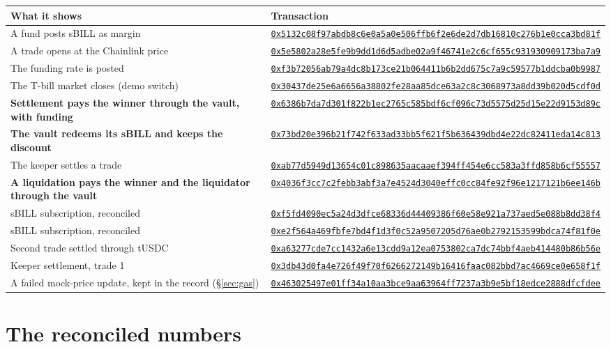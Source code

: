\documentclass[11pt,a4paper]{article}
\newcommand{\note}[1]{{\small\color{muted}#1}}
\newcommand{\etx}[1]{{\footnotesize\href{https://sepolia.etherscan.io/tx/#1}{\nolinkurl{#1}}}}
\begin{document}
\begin{center}
\footnotesize
\begin{tabular}{@{}p{5.6cm}p{9.6cm}@{}}
\toprule
\textbf{What it shows} & \textbf{Transaction} \\
\midrule
A fund posts sBILL as margin & \etx{0x5132c08f97abdb8c6e0a5a0e506ffb6f2e6de2d7db16810c276b1e0cca3bd81f} \\
A trade opens at the Chainlink price & \etx{0x5e5802a28e5fe9b9dd1d6d5adbe02a9f46741e2c6cf655c931930909173ba7a9} \\
The funding rate is posted & \etx{0xf3b72056ab79a4dc8b173ce21b064411b6b2dd675c7a9c59577b1ddcba0b9987} \\
The T-bill market closes (demo switch) & \etx{0x30437de25e6a6656a38802fe28aa85dce63a2c8c3068973a8dd39b020d5cdf0d} \\
\textbf{Settlement pays the winner through the vault, with funding} & \etx{0x6386b7da7d301f822b1ec2765c585bdf6cf096c73d5575d25d15e22d9153d89c} \\
\textbf{The vault redeems its sBILL and keeps the discount} & \etx{0x73bd20e396b21f742f633ad33bb5f621f5b636439dbd4e22dc82411eda14c813} \\
The keeper settles a trade & \etx{0xab77d5949d13654c01c898635aacaaef394ff454e6cc583a3ffd858b6cf55557} \\
\textbf{A liquidation pays the winner and the liquidator through the vault} & \etx{0x4036f3cc7c2febb3abf3a7e4524d3040effc0cc84fe92f96e1217121b6ee146b} \\
\midrule
sBILL subscription, reconciled & \etx{0xf5fd4090ec5a24d3dfce68336d44409386f60e58e921a737aed5e088b8dd38f4} \\
sBILL subscription, reconciled & \etx{0xe2f564a469fbfe7bd4f1d3f0c52a9507205d76ae0b2792153599bdca74f81f0e} \\
Second trade settled through tUSDC & \etx{0xa63277cde7cc1432a6e13cdd9a12ea0753802ca7dc74bbf4aeb414480b86b56e} \\
Keeper settlement, trade 1 & \etx{0x3db43d0fa4e726f49f70f6266272149b16416faac082bbd7ac4669ce0e658f1f} \\
\note{A failed mock-price update, kept in the record (\S\ref{sec:gas})} & \etx{0x463025497e01ff34a10aa3bce9aa63964ff7237a3b9e5bf18edce2888dfcfdee} \\
\bottomrule
\end{tabular}
\end{center}

\section{The reconciled numbers}\label{app:recon}
\end{document}
